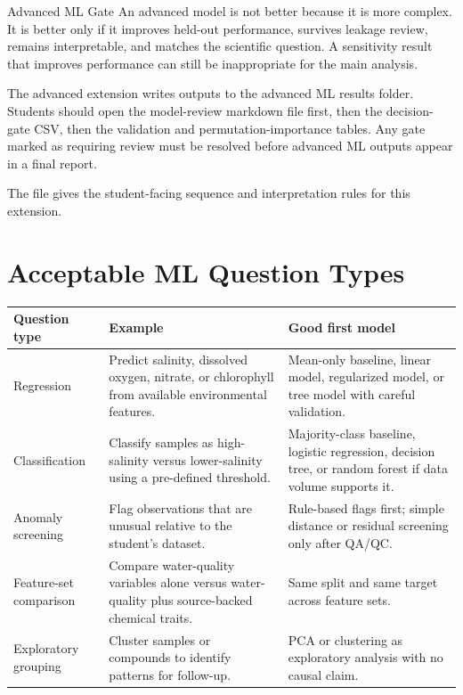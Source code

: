\begin{cautionbox}{Advanced ML Gate}
An advanced model is not better because it is more complex. It is better only if it improves held-out performance, survives leakage review, remains interpretable, and matches the scientific question. A sensitivity result that improves performance can still be inappropriate for the main analysis.
\end{cautionbox}

The advanced extension writes outputs to the advanced ML results folder. Students should open the model-review markdown file first, then the decision-gate CSV, then the validation and permutation-importance tables. Any gate marked as requiring review must be resolved before advanced ML outputs appear in a final report.

The  file gives the student-facing sequence and interpretation rules for this extension.

\section{Acceptable ML Question Types}

\begin{longtable}{p{}p{}p{}}
\toprule
\textbf{Question type} & \textbf{Example} & \textbf{Good first model} \\
\midrule
Regression & Predict salinity, dissolved oxygen, nitrate, or chlorophyll from available environmental features. & Mean-only baseline, linear model, regularized model, or tree model with careful validation. \\
Classification & Classify samples as high-salinity versus lower-salinity using a pre-defined threshold. & Majority-class baseline, logistic regression, decision tree, or random forest if data volume supports it. \\
Anomaly screening & Flag observations that are unusual relative to the student's dataset. & Rule-based flags first; simple distance or residual screening only after QA/QC. \\
Feature-set comparison & Compare water-quality variables alone versus water-quality plus source-backed chemical traits. & Same split and same target across feature sets. \\
Exploratory grouping & Cluster samples or compounds to identify patterns for follow-up. & PCA or clustering as exploratory analysis with no causal claim. \\
\bottomrule
\end{longtable}

